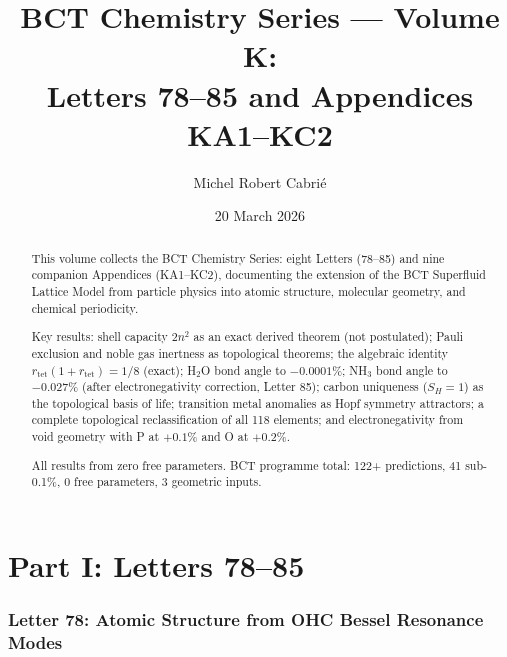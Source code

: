 \documentclass[aps,preprint,superscriptaddress,floatfix]{revtex4-2}
\begin{document}
\title{BCT Chemistry Series --- Volume K:\\
Letters 78--85 and Appendices KA1--KC2}

\author{Michel Robert Cabri\'{e}}

\date{20 March 2026}

\begin{abstract}
This volume collects the BCT Chemistry Series: eight Letters
(78--85) and nine companion Appendices (KA1--KC2), documenting
the extension of the BCT Superfluid Lattice Model from particle
physics into atomic structure, molecular geometry, and chemical
periodicity.

Key results: shell capacity $2n^2$ as an exact derived theorem
(not postulated); Pauli exclusion and noble gas inertness as
topological theorems; the algebraic identity
$r_\mathrm{tet}(1+r_\mathrm{tet}) = 1/8$ (exact);
H$_2$O bond angle to $-0.0001\%$; NH$_3$ bond angle to
$-0.027\%$ (after electronegativity correction, Letter 85);
carbon uniqueness ($S_H = 1$) as the topological basis of life;
transition metal anomalies as Hopf symmetry attractors;
a complete topological reclassification of all 118 elements;
and electronegativity from void geometry with P at $+0.1\%$
and O at $+0.2\%$.

All results from zero free parameters. BCT programme total:
122+ predictions, 41 sub-0.1\%, 0 free parameters,
3 geometric inputs.
\end{abstract}

\maketitle
\tableofcontents


\newpage
\part*{Part I: Letters 78--85}


\newpage
\section*{Letter 78: Atomic Structure from OHC Bessel Resonance Modes}
% 
\end{document}
